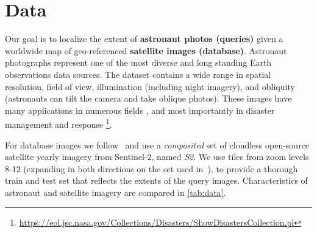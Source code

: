 
\section{Data}
\label{sec:datasets}

Our goal is to localize the extent of \textbf{astronaut photos (queries)} given a worldwide map of geo-referenced \textbf{satellite images (database)}.
Astronaut photographs represent one of the most diverse and long standing Earth observations data sources. The dataset contains a wide range in spatial resolution, field of view, illumination (including night imagery), and obliquity (astronauts can tilt the camera and take oblique photos).
These images have many applications in numerous fields
\cite{sprites, TLEs, astro_photos_climate_patterns, Sanchez_2022_artificial_lightning, Gaston_2022_environ_impacts_artificial_light, Small_2022_spectrometry_urban_lightscape, Schirmer_2019_nightlight_behavior}, and
most importantly in disaster management and response \cite{IDC_Stefanov}\footnote{\url{https://eol.jsc.nasa.gov/Collections/Disasters/ShowDisastersCollection.pl}}.

For database images we follow~\cite{Berton_2024_EarthLoc} and use a \textit{composited} set of cloudless open-source satellite yearly imagery from Sentinel-2, named \textit{S2}.
We use tiles from zoom levels 8-12 \cite{osm_zoom_levels} (expanding in both directions on the set used in~\cite{Berton_2024_EarthLoc}), to provide a thorough train and test set that reflects the extents of the query images.
Characteristics of astronaut and satellite imagery are compared in \cref{tab:data}.

